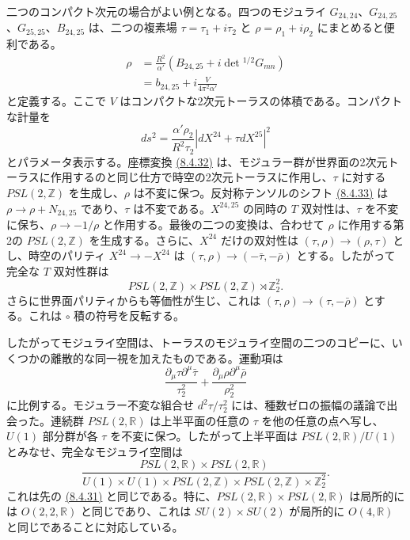 二つのコンパクト次元の場合がよい例となる。四つのモジュライ $G_{24,24}$、$G_{24,25}$、$G_{25,25}$、$B_{24,25}$ は、二つの複素場 $\tau=\tau_1+i\tau_2$ と $\rho=\rho_1+i\rho_2$ にまとめると便利である。
\begin{equation}
\begin{aligned}
\rho&=\frac{R^2}{\alpha'}\left(B_{24,25}+i\det{}^{1/2}G_{mn}\right)\\
&=b_{24,25}+i\frac V{4\pi^2\alpha'}
\end{aligned}
\tag{8.4.36}\label{eq:8.4.36}
\end{equation}
と定義する。ここで $V$ はコンパクトな2次元トーラスの体積である。コンパクトな計量を
\begin{equation}
ds^2=\frac{\alpha'\rho_2}{R^2\tau_2}\left|dX^{24}+\tau dX^{25}\right|^2
\tag{8.4.37}\label{eq:8.4.37}
\end{equation}
とパラメータ表示する。座標変換 \hyperref[eq:8.4.32]{(8.4.32)} は、モジュラー群が世界面の2次元トーラスに作用するのと同じ仕方で時空の2次元トーラスに作用し、$\tau$ に対する $PSL(2,\mathbb Z)$ を生成し、$\rho$ は不変に保つ。反対称テンソルのシフト \hyperref[eq:8.4.33]{(8.4.33)} は $\rho\to\rho+N_{24,25}$ であり、$\tau$ は不変である。$X^{24,25}$ の同時の $T$ 双対性は、$\tau$ を不変に保ち、$\rho\to-1/\rho$ と作用する。最後の二つの変換は、合わせて $\rho$ に作用する第2の $PSL(2,\mathbb Z)$ を生成する。さらに、$X^{24}$ だけの双対性は $(\tau,\rho)\to(\rho,\tau)$ とし、時空のパリティ $X^{24}\to-X^{24}$ は $(\tau,\rho)\to(-\bar\tau,-\bar\rho)$ とする。したがって完全な $T$ 双対性群は
\begin{equation}
PSL(2,\mathbb Z)\times PSL(2,\mathbb Z)\rtimes\mathbb Z_2^2.
\tag{8.4.38}\label{eq:8.4.38}
\end{equation}
さらに世界面パリティからも等価性が生じ、これは $(\tau,\rho)\to(\tau,-\bar\rho)$ とする。これは $\circ$ 積の符号を反転する。

したがってモジュライ空間は、トーラスのモジュライ空間の二つのコピーに、いくつかの離散的な同一視を加えたものである。運動項は
\begin{equation}
\frac{\partial_\mu\tau\partial^\mu\bar\tau}{\tau_2^2}
+\frac{\partial_\mu\rho\partial^\mu\bar\rho}{\rho_2^2}
\tag{8.4.39}\label{eq:8.4.39}
\end{equation}
に比例する。モジュラー不変な組合せ $d^2\tau/\tau_2^2$ には、種数ゼロの振幅の議論で出会った。連続群 $PSL(2,\mathbb R)$ は上半平面の任意の $\tau$ を他の任意の点へ写し、$U(1)$ 部分群が各 $\tau$ を不変に保つ。したがって上半平面は $PSL(2,\mathbb R)/U(1)$ とみなせ、完全なモジュライ空間は
\begin{equation}
\frac{PSL(2,\mathbb R)\times PSL(2,\mathbb R)}
{U(1)\times U(1)\times PSL(2,\mathbb Z)\times PSL(2,\mathbb Z)\times\mathbb Z_2^2}.
\tag{8.4.40}\label{eq:8.4.40}
\end{equation}
これは先の \hyperref[eq:8.4.31]{(8.4.31)} と同じである。特に、$PSL(2,\mathbb R)\times PSL(2,\mathbb R)$ は局所的には $O(2,2,\mathbb R)$ と同じであり、これは $SU(2)\times SU(2)$ が局所的に $O(4,\mathbb R)$ と同じであることに対応している。

